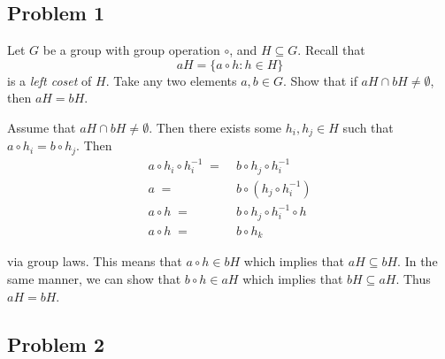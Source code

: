 \documentclass[../hw_sols.tex]{subfiles}
\begin{document}

\subsection*{Problem 1}
\label{prob1}

Let $G$ be a group with group operation $\circ$, and $H \subseteq G$. Recall 
that
	\[ aH = \{a \circ h: h \in H\} \]
is a \textit{left coset} of $H$. Take any two elements $a, b \in G$. Show 
that if $aH \cap bH \neq \emptyset$, then $aH = bH$.

\begin{solution}

Assume that $aH \cap bH \neq \emptyset$. Then there exists some 
$h_i,h_j \in H$ such that $a \circ h_i = b \circ h_j$. Then
\begin{align*}
	a \circ h_i \circ h_i^{-1} \; =& \; b \circ h_j \circ h_i^{-1} \\
	a \; =& \; b \circ \left( h_j \circ h_i^{-1} \right) \\
	a \circ h \; =& \; b \circ h_j \circ h_i^{-1} \circ h \\
	a \circ h \; =& \; b \circ h_k
\end{align*}

via group laws. This means that $a \circ h \in bH$ which implies that 
$aH \subseteq bH$. In the same manner, we can show that $b \circ h \in aH$ 
which implies that $bH \subseteq aH$. Thus $aH = bH$.

\end{solution}


\newpage



\subsection*{Problem 2}
\end{document}
